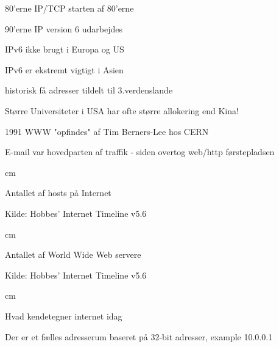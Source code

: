 \documentclass[Screen16to9,17pt]{foils}
\begin{document}

\begin{list1}
\item 80'erne IP/TCP starten af 80'erne
\item 90'erne IP version 6 udarbejdes
  \begin{list2}
  \item IPv6 ikke brugt i Europa og US
  \item IPv6 er ekstremt vigtigt i Asien
  \item historisk få adresser tildelt til 3.verdenslande
  \item Større Universiteter i USA har ofte større allokering end Kina!
  \end{list2}
\item 1991 WWW "opfindes" af Tim Berners-Lee hos CERN
\item E-mail var hovedparten af traffik
  - siden overtog web/http førstepladsen
\end{list1}


 cm

\centerline{Antallet af hosts på Internet}


\begin{list1}
\item Kilde:
Hobbes' Internet Timeline v5.6\\
\end{list1}


 cm

\centerline{Antallet af World Wide Web servere}


\begin{list1}
\item Kilde: Hobbes' Internet Timeline v5.6\\
\end{list1}




 cm

\begin{list1}
\item Hvad kendetegner internet idag
\item Der er et fælles adresserum baseret på 32-bit adresser, example 10.0.0.1
\end{list1}
\end{document}
